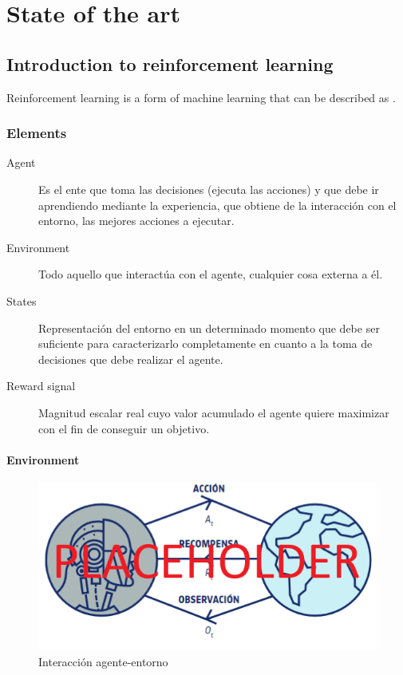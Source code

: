 \chapter{State of the art}
\label{chapter:state_of_the_art}

\section{Introduction to reinforcement learning}

Reinforcement learning is a form of machine learning that can be described as  \cite{Kaelbling:1996}.

\subsection{Elements}

\begin{description}
    \item[Agent] Es el ente que toma las decisiones (ejecuta las acciones) y que debe ir aprendiendo mediante la experiencia, que obtiene de la interacción con el entorno, las mejores acciones a ejecutar.
    \item[Environment] Todo aquello que interactúa con el agente, cualquier cosa externa a él.
    \item[States] Representación del entorno en un determinado momento que debe ser suficiente para caracterizarlo completamente en cuanto a la toma de decisiones que debe realizar el agente.
    \item[Reward signal] Magnitud escalar real cuyo valor acumulado el agente quiere maximizar con el fin de conseguir un objetivo.
\end{description}

\subsubsection{Environment}

\begin{figure}[!h]
    \centering
    \includegraphics[width=.8\textwidth]{figs/RL_schema.png}
    \caption{Interacción agente-entorno}
    \label{fig:interaction}
\end{figure}

